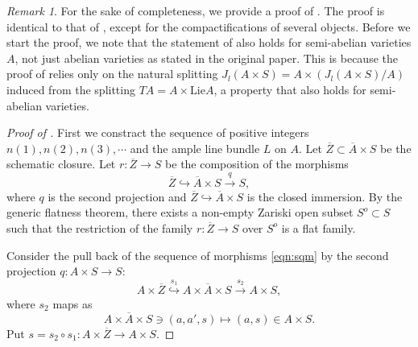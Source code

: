 \documentclass[11pt,english]{smfart}
\theoremstyle{plain}
\theoremstyle{definition}
\theoremstyle{remark}
\newtheorem{rem}[thm]{Remark}
\numberwithin{equation}{section}
\theoremstyle{plain}
\begin{document}
	
		
\begin{rem}\label{rem:2025:09041}
For the sake of completeness, we provide a proof of  . 
The proof is identical to that of \cite[Prop 6]{Yam15}, except for the compactifications of several objects.
Before we start the proof, we note that the statement of \cite[Cor 3]{Yam15} also holds for semi-abelian varieties $A$, not just abelian varieties as stated in the original paper.
This is because the proof of \cite[Cor 3]{Yam15} relies only on the natural splitting $J_l(A\times S)=A\times (J_l(A\times S)/A)$ induced from the splitting $TA=A\times\mathrm{Lie}A$, a property that also holds for semi-abelian varieties.
\begin{proof}[Proof of  ]
First we constract the sequence of positive integers $n(1),n(2),n(3),\cdots$ and the ample line bundle $L$ on $A$.
Let $\overline{Z}\subset \overline{A}\times S$ be the schematic closure.
Let $r:\overline{Z}\to S$ be the composition of the morphisms
\begin{equation}\label{eqn:sqm}
\overline{Z}\hookrightarrow \overline{A}\times S\overset{q}{\to}S,
\end{equation}
where $q$ is the second projection and $\overline{Z}\hookrightarrow \overline{A}\times S$ is the closed immersion.
By the generic flatness theorem, there exists a non-empty Zariski open subset $S^o\subset S$ such that the restriction of the family $r:\overline{Z}\to S$ over $S^o$ is a flat family.
\par


Consider the pull back of the sequence of morphisms \eqref{eqn:sqm} by the second projection $q:A\times S\to S$:
$$A\times \overline{Z}\overset{s_1}{\hookrightarrow}A\times \overline{A}\times S\overset{s_2}{\to}A\times S,$$
where $s_2$ maps as
$$A\times \overline{A}\times S\ni (a,a',s)\mapsto (a,s)\in A\times S.$$
Put $s=s_2\circ s_1:A\times \overline{Z}\to A\times S$. 
\par


\end{proof}
\end{rem}
\end{document}
